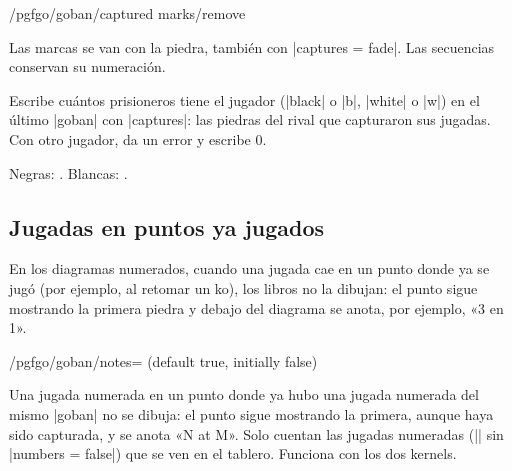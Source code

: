 	\begin{stylekey}{/pgfgo/goban/captured marks/remove}

		Las marcas se van con la piedra, también con |captures = fade|. Las secuencias conservan su numeración.
	\end{stylekey}

	\begin{command}{\pgfgoprisoners{}}
		Escribe cuántos prisioneros tiene el jugador (|black| o |b|, |white| o |w|) en el último |goban| con |captures|: las piedras del rival que capturaron sus jugadas. Con otro jugador, da un error y escribe 0.

		\begin{codeexample}[]

			\begin{goban}[captures]
			\end{goban}

			Negras: . Blancas: .
		\end{codeexample}
	\end{command}

	\subsection{Jugadas en puntos ya jugados}
	\label{subsec:notas}

	En los diagramas numerados, cuando una jugada cae en un punto donde ya se jugó (por ejemplo, al retomar un ko), los libros no la dibujan: el punto sigue mostrando la primera piedra y debajo del diagrama se anota, por ejemplo, «3 en 1».

	\begin{key}{/pgfgo/goban/notes= (default true, initially false)}

		Una jugada numerada en un punto donde ya hubo una jugada numerada del mismo |goban| no se dibuja: el punto sigue mostrando la primera, aunque haya sido capturada, y se anota «N at M». Solo cuentan las jugadas numeradas (|\moves| sin |numbers = false|) que se ven en el tablero. Funciona con los dos kernels.

		\begin{codeexample}[]

			\begin{goban}[notes]
			\end{goban}

			\pgfgomovenotes[at = en]
		\end{codeexample}
	\end{key}

